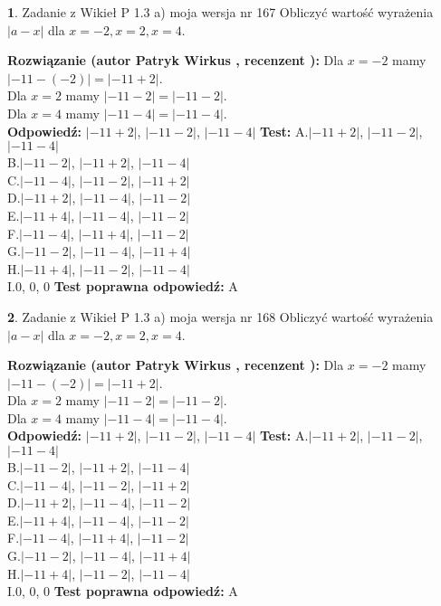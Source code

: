 \documentclass[12pt, a4paper]{article}
\theoremstyle{definition} %
\newtheorem{zad}{}
\newcommand{\zadStart}[1]{\begin{zad}#1\newline}
\newcommand{\zadStop}{\end{zad}}
\newcommand{\rozwStart}[2]{\noindent \textbf{Rozwiązanie (autor #1 , recenzent #2): }\newline}
\newcommand{\rozwStop}{\newline}
\newcommand{\odpStart}{\noindent \textbf{Odpowiedź:}\newline}
\newcommand{\odpStop}{\newline}
\newcommand{\testStart}{\noindent \textbf{Test:}\newline}
\newcommand{\testStop}{\newline}
\newcommand{\kluczStart}{\noindent \textbf{Test poprawna odpowiedź:}\newline}
\newcommand{\kluczStop}{\newline}
\begin{document}
\zadStart{Zadanie z Wikieł P 1.3 a) moja wersja nr 167}
Obliczyć wartość wyrażenia $|a - x|$ dla $x=-2,x=2,x=4$.
\zadStop
\rozwStart{Patryk Wirkus}{}
Dla $x = -2$ mamy $|-11 - (-2)| = |-11 + 2|$.\\
Dla $x = 2$ mamy $|-11 - 2| = |-11 - 2|$.\\
Dla $x = 4$ mamy $|-11 - 4| = |-11 - 4|$.\\
\rozwStop
\odpStart
$|-11 + 2|$, $|-11 - 2|$, $|-11 - 4|$
\odpStop
\testStart
A.$|-11 + 2|$, $|-11 - 2|$, $|-11 - 4|$\\
B.$|-11 - 2|$, $|-11 + 2|$, $|-11 - 4|$\\
C.$|-11 - 4|$, $|-11 - 2|$, $|-11 + 2|$\\
D.$|-11 + 2|$, $|-11 - 4|$, $|-11 - 2|$\\
E.$|-11 + 4|$, $|-11 - 4|$, $|-11 - 2|$\\
F.$|-11 - 4|$, $|-11 + 4|$, $|-11 - 2|$\\
G.$|-11 - 2|$, $|-11 - 4|$, $|-11 + 4|$\\
H.$|-11 + 4|$, $|-11 - 2|$, $|-11 - 4|$\\
I.$0$, $0$, $0$
\testStop
\kluczStart
A
\kluczStop



\zadStart{Zadanie z Wikieł P 1.3 a) moja wersja nr 168}
Obliczyć wartość wyrażenia $|a - x|$ dla $x=-2,x=2,x=4$.
\zadStop
\rozwStart{Patryk Wirkus}{}
Dla $x = -2$ mamy $|-11 - (-2)| = |-11 + 2|$.\\
Dla $x = 2$ mamy $|-11 - 2| = |-11 - 2|$.\\
Dla $x = 4$ mamy $|-11 - 4| = |-11 - 4|$.\\
\rozwStop
\odpStart
$|-11 + 2|$, $|-11 - 2|$, $|-11 - 4|$
\odpStop
\testStart
A.$|-11 + 2|$, $|-11 - 2|$, $|-11 - 4|$\\
B.$|-11 - 2|$, $|-11 + 2|$, $|-11 - 4|$\\
C.$|-11 - 4|$, $|-11 - 2|$, $|-11 + 2|$\\
D.$|-11 + 2|$, $|-11 - 4|$, $|-11 - 2|$\\
E.$|-11 + 4|$, $|-11 - 4|$, $|-11 - 2|$\\
F.$|-11 - 4|$, $|-11 + 4|$, $|-11 - 2|$\\
G.$|-11 - 2|$, $|-11 - 4|$, $|-11 + 4|$\\
H.$|-11 + 4|$, $|-11 - 2|$, $|-11 - 4|$\\
I.$0$, $0$, $0$
\testStop
\kluczStart
A
\kluczStop
\end{document}

